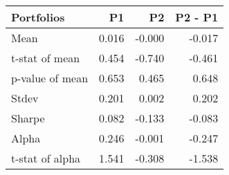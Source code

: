 \begin{tabular}{lrrr}
\toprule
Portfolios & P1 & P2 & P2 - P1 \\
\midrule
Mean & 0.016 & -0.000 & -0.017 \\
t-stat of mean & 0.454 & -0.740 & -0.461 \\
p-value of mean & 0.653 & 0.465 & 0.648 \\
Stdev & 0.201 & 0.002 & 0.202 \\
Sharpe & 0.082 & -0.133 & -0.083 \\
Alpha & 0.246 & -0.001 & -0.247 \\
t-stat of alpha & 1.541 & -0.308 & -1.538 \\
\bottomrule
\end{tabular}
